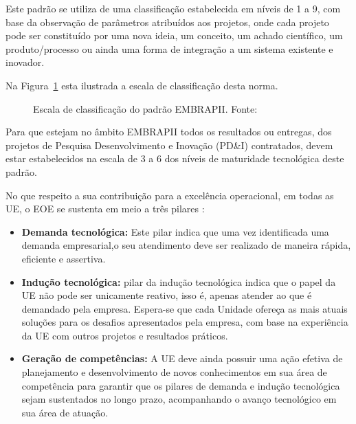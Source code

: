   Este padrão se utiliza de uma classificação estabelecida em níveis de 1 a 9, com base da observação de parâmetros atribuídos aos projetos, onde cada projeto pode ser constituído por uma nova ideia, um conceito, um achado científico, um produto/processo ou ainda uma forma de integração a um sistema existente e inovador.

  Na Figura~\ref{niveis_embrapii} esta ilustrada a escala de classificação desta norma.

  \begin{figure}[!h]
    \centering
    \caption{Escala de classificação do padrão EMBRAPII. Fonte: \cite{embrapii_manual}}
    \label{niveis_embrapii}
  \end{figure}

  Para que estejam no âmbito EMBRAPII todos os resultados ou entregas, dos projetos de Pesquisa Desenvolvimento e Inovação (PD\&I) contratados, devem estar estabelecidos na escala de 3 a 6 dos níveis de maturidade tecnológica deste padrão.

  No que respeito a sua contribuição para a excelência operacional, em todas as UE, o EOE se sustenta em meio a três pilares \cite{embrapii_sistema}:

  \begin{itemize}
    \item \textbf{Demanda tecnológica:} Este pilar indica que uma vez identificada uma demanda empresarial,o seu atendimento deve ser realizado de maneira rápida, eficiente e assertiva.
    \item \textbf{Indução tecnológica:} pilar da indução tecnológica indica que o papel da UE não pode ser unicamente reativo, isso é, apenas atender ao que é demandado pela empresa. Espera-se que cada Unidade ofereça as mais atuais soluções para os desafios apresentados pela empresa, com base na experiência da UE com outros projetos e resultados práticos.
    \item \textbf{Geração de competências:} A UE deve ainda possuir uma ação efetiva de planejamento e desenvolvimento de novos conhecimentos em sua área de competência para garantir que os pilares de demanda e indução tecnológica sejam sustentados no longo prazo, acompanhando o avanço tecnológico em sua área de atuação.
  \end{itemize}
